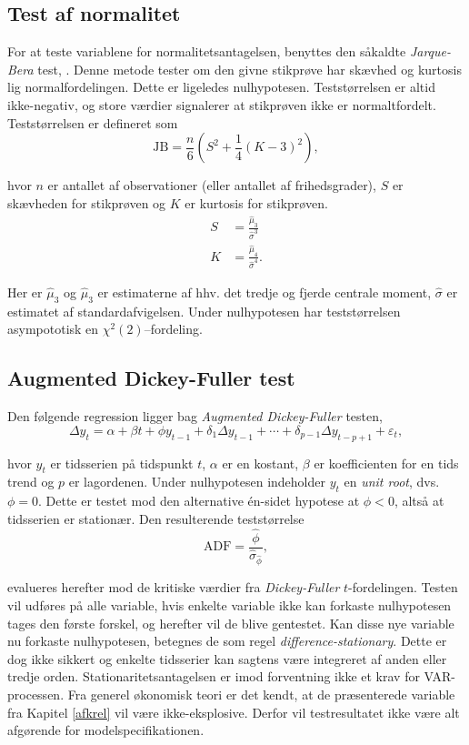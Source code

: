 \documentclass[
  a4paper,
  oneside]{memoir}
\begin{document}
\hypertarget{test-af-normalitet}{%
\subsection{Test af normalitet}\label{test-af-normalitet}}

For at teste variablene for normalitetsantagelsen, benyttes den såkaldte \emph{Jarque-Bera} test, \citep{Jarque1980}. Denne metode tester om den givne stikprøve har skævhed og kurtosis lig normalfordelingen. Dette er ligeledes nulhypotesen. Teststørrelsen er altid ikke-negativ, og store værdier signalerer at stikprøven ikke er normaltfordelt. Teststørrelsen er defineret som
\[\text{JB}=\frac{n}{6}\left(S^2+\frac{1}{4}(K-3)^2\right),\]

hvor \(n\) er antallet af observationer (eller antallet af frihedsgrader), \(S\) er skævheden for stikprøven og \(K\) er kurtosis for stikprøven.
\begin{align*}
S&=\frac{\hat{\mu}_3}{\hat{\sigma}^3}\\
K&=\frac{\hat{\mu}_4}{\hat{\sigma}^4}.
\end{align*}

Her er \(\hat{\mu}_3\) og \(\hat{\mu}_3\) er estimaterne af hhv. det tredje og fjerde centrale moment, \(\hat{\sigma}\) er estimatet af standardafvigelsen. Under nulhypotesen har teststørrelsen asympototisk en \(\chi^2(2)\)--fordeling.

\hypertarget{augmented-dickey-fuller-test}{%
\subsection{Augmented Dickey-Fuller test}\label{augmented-dickey-fuller-test}}

Den følgende regression ligger bag \emph{Augmented Dickey-Fuller} testen, \citep{Dickey1979}
\[\Delta y_{t} = \alpha + \beta t + \phi y_{t-1} + \delta_1 \Delta y_{t-1} + \cdots + \delta_{p-1}\Delta y_{t-p+1} + \varepsilon_t,\]

hvor \(y_t\) er tidsserien på tidspunkt \(t\), \(\alpha\) er en kostant, \(\beta\) er koefficienten for en tids trend og \(p\) er lagordenen. Under nulhypotesen indeholder \(y_t\) en \emph{unit root}, dvs. \(\phi=0\). Dette er testet mod den alternative én-sidet hypotese at \(\phi<0\), altså at tidsserien er stationær. Den resulterende teststørrelse
\[\text{ADF}=\frac{\hat{\phi}}{\hat{\sigma}_{\hat{\phi}}},\]

evalueres herefter mod de kritiske værdier fra \emph{Dickey-Fuller} \(t\)-fordelingen. Testen vil udføres på alle variable, hvis enkelte variable ikke kan forkaste nulhypotesen tages den første forskel, og herefter vil de blive gentestet. Kan disse nye variable nu forkaste nulhypotesen, betegnes de som regel \emph{difference-stationary}. Dette er dog ikke sikkert og enkelte tidsserier kan sagtens være integreret af anden eller tredje orden. Stationaritetsantagelsen er imod forventning ikke et krav for VAR-processen. Fra generel økonomisk teori er det kendt, at de præsenterede variable fra Kapitel \ref{afkrel} vil være ikke-eksplosive. Derfor vil testresultatet ikke være alt afgørende for modelspecifikationen.
\end{document}

